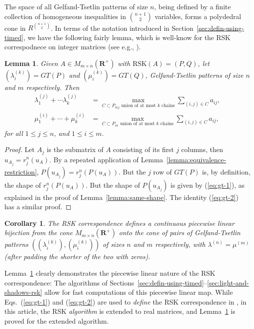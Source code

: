 \documentclass[10pt]{amsproc}
\newtheorem{lemma}[theorem]{Lemma}
\newtheorem{corollary}[theorem]{Corollary}
\theoremstyle{definition}
\theoremstyle{remark}
\newcommand{\rp}{\mathbf{R}^+}
\newcommand{\rsk}{\mathrm{RSK}}
\begin{document}
The space of all Gelfand-Tsetlin patterns of size $n$, being defined by a finite collection of homogeneous inequalities in $\binom{n+1}2$ variables, forms a polydedral cone in $R^{\binom{n+1}2}$.
In terms of the notation introduced in Section~\ref{sec:defin-using-timed}, we have the following fairly lemma, which is well-know for the RSK correspodnece on integer matrices (see e.g., \cite[Prop.~2.26]{kir-trop}).
\begin{lemma}
  \label{lemma:pl}
  Given $A\in M_{m\times n}(\rp)$ with $\rsk(A)=(P,Q)$, let $(\lambda^{(k)}_i)=GT(P)$ and $(\mu^{(k)}_i)=GT(Q)$, Gelfand-Tsetlin patterns of size $n$ and $m$ respectively.
  Then
  \begin{align}
    \label{eq:gt-1}
    \lambda^{(j)}_1 + \dotsb \lambda_k^{(j)} & = \max_{C\subset P_{mj}\text{ union of at most $k$ chains}} \sum_{(i,j)\in C} a_{ij},\\
    \label{eq:gt-2}
    \mu_1^{(i)} + \dotsb + \mu_k^{(i)} & = \max_{C\subset P_{in}\text{ union of at most $k$ chains}} \sum_{(i,j)\in C} a_{ij},
  \end{align}
  for all $1\leq j\leq n$, and $1\leq i\leq m$.
\end{lemma}
\begin{proof}
  Let $A_j$ is the submatrix of $A$ consisting of its first $j$ columns, then $u_{A_j} = r^n_j(u_A)$.
  By a repeated application of Lemma~\ref{lemma:equivalence-restriction}, $P(u_{A_j}) = r^n_j(P(u_A))$.
  But the $j$ row of $GT(P)$ is, by definition, the shape of $r^n_j(P(u_A))$.
  But the shape of $P(u_{A_j})$ is given by (\ref{eq:gt-1}), as explained in the proof of Lemma~\ref{lemma:same-shape}.
  The identity (\ref{eq:gt-2}) has a similar proof.
\end{proof}
\begin{corollary}
  The RSK correspondence defines a continuous piecewise linear bijection from the cone $M_{m\times n}(\rp)$ onto the cone of pairs of Gelfand-Tsetlin patterns $((\lambda^{(k)}_i), (\mu^{(k)}_i))$ of sizes $n$ and $m$ respectively, with $\lambda^{(n)}=\mu^{(m)}$ (after padding the shorter of the two with zeros).
\end{corollary}
Lemma~\ref{lemma:pl} clearly demonstrates the piecewise linear nature of the RSK correspondence:
The algorithms of Sections~\ref{sec:defin-using-timed}--\ref{sec:light-and-shadows-rsk} allow for fast computations of this piecewise linear map.
While Eqs.~(\ref{eq:gt-1}) and (\ref{eq:gt-2}) are used to \emph{define} the RSK correspondence in \cite{kir-trop}, in this article, the RSK \emph{algorithm} is extended to real matrices, and Lemma~\ref{lemma:pl} is proved for the extended algorithm.
\end{document}
